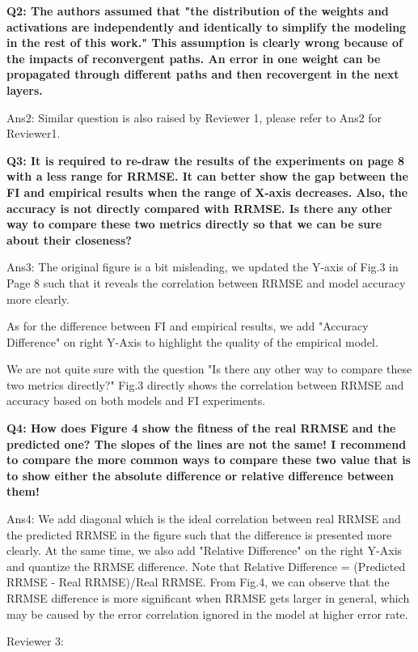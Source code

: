 \textbf{
Q2: The authors assumed that "the distribution of the weights and activations are independently and identically to simplify the modeling in the rest of this work." This assumption is clearly wrong because of the impacts of reconvergent paths. An error in one weight can be propagated through different paths and then recovergent in the next layers. }

Ans2: Similar question is also raised by Reviewer 1, please refer to Ans2 for Reviewer1.

\textbf{Q3: It is required to re-draw the results of the experiments on page 8 with a less range for RRMSE. It can better show the gap between the FI and empirical results when the range of X-axis decreases. Also, the accuracy is not directly compared with RRMSE. Is there any other way to compare these two metrics directly so that we can be sure about their closeness?} 

Ans3: The original figure is a bit misleading, we updated the Y-axis of Fig.3 in Page 8 such that it reveals the correlation between RRMSE and model accuracy more clearly.

As for the difference between FI and empirical results, we add "Accuracy Difference" on right Y-Axis to highlight the quality of the empirical model. 

We are not quite sure with the question "Is there any other way to compare these two metrics directly?" Fig.3 directly shows the correlation between RRMSE and accuracy based on both models and FI experiments. 

\textbf{Q4: How does Figure 4 show the fitness of the real RRMSE and the predicted one? The slopes of the lines are not the same! I recommend to compare the more common ways to compare these two value that is to show either the absolute difference or relative difference between them!}

Ans4: We add diagonal which is the ideal correlation between real RRMSE and the predicted RRMSE in the figure such that the difference is presented more clearly. At the same time, we also add "Relative Difference" on the right Y-Axis and quantize the RRMSE difference. Note that Relative Difference = (Predicted RRMSE - Real RRMSE)/Real RRMSE. From Fig.4, we can observe that the RRMSE difference is more significant when RRMSE gets larger in general, which may be caused by the error correlation ignored in the model at higher error rate.

Reviewer 3:

